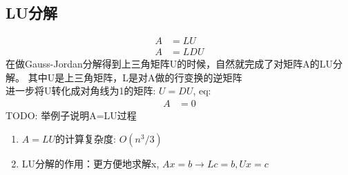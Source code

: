 \documentclass{book}
\begin{document}
\subsection{LU分解}
\begin{equation}
  \begin{aligned}
    A&=LU\\ 
    A&=LDU
  \end{aligned}
  \label{eq: LU1}
\end{equation}
在做Gauss-Jordan分解得到上三角矩阵U的时候，自然就完成了对矩阵A的LU分解。
其中U是上三角矩阵，L是对A做的行变换的逆矩阵\\ 
进一步将U转化成对角线为1的矩阵: $U=DU$, eq:
\begin{equation*}
  \begin{aligned}
    A&= 0
  \end{aligned}
  \label{eq: LU2}
\end{equation*}
TODO: 举例子说明A=LU过程

\begin{enumerate}
  \item $A=LU$的计算复杂度: $O(n^3/3)$
  \item LU分解的作用：更方便地求解x, $Ax=b \rightarrow Lc= b, Ux=c$
\end{enumerate}
\end{document}
